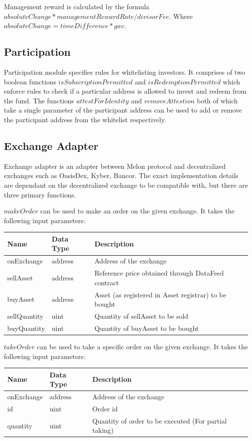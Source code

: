 \documentclass[conference]{IEEEtran}
\begin{document}
Management reward is calculated by the formula $absoluteChange * managementRewardRate / divisorFee$. Where $absoluteChange = timeDifference * gav$.


\subsection{Participation}

Participation module specifies rules for whitelisting investors. It comprises of two boolean functions $isSubscriptionPermitted$ and $isRedemptionPermitted$ which enforce rules to check if a particular address is allowed to invest and redeem from the fund. The functions $attestForIdentity$ and $removeAttestion$ both of which take a single parameter of the participant address can be used to add or remove  the participant address from the whitelist respectively. 

\subsection{Exchange Adapter}

Exchange adapter is an adapter between Melon protocol and decentralized exchanges such as OasisDex, Kyber, Bancor. The exact implementation details are dependant on the decentralized exchange to be compatible with, but there are three primary functions.

$makeOrder$ can be used to make an order on the given exchange. It takes the following input parameters:
\begin{center}
	\footnotesize
	\begin{tabular}{ | p{2.7cm} | p{0.8cm} | p{4cm} | }
		\hline
		Name & Data Type & Description \\ \hline
		onExchange & address & Address of the exchange \\ \hline
		sellAsset & address &  Reference price obtained through DataFeed contract \\ \hline
		buyAsset & address & Asset (as registered in Asset registrar) to be bought \\ \hline
		sellQuantity & uint & Quantity of sellAsset to be sold \\ \hline
		buyQuantity & uint & Quantity of buyAsset to be bought \\ \hline
	\end{tabular}
\end{center}

$takeOrder$ can be used to take a specific order on the given exchange. It takes the following input parameters:
\begin{center}
	\footnotesize
	\begin{tabular}{ | p{2.7cm} | p{0.8cm} | p{4cm} | }
		\hline
		Name & Data Type & Description \\ \hline
		onExchange & address & Address of the exchange \\ \hline
		id & uint & Order id \\ \hline
		quantity & uint & Quantity of order to be executed (For partial taking) \\ \hline
	\end{tabular}
\end{center}
\end{document}
